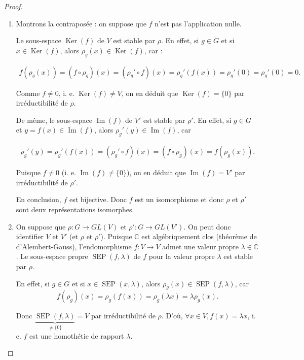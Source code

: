 \documentclass[french]{book}
\theoremstyle{definition}
\theoremstyle{remark}
\begin{document}
\begin{proof}

  \

  \begin{enumerate}
    \item Montrons la contraposée : on suppose que \(f\) n'est pas l'application nulle.

    Le sous-espace \(\operatorname{Ker}(f)\) de \(V\) est stable par \(\rho\). En effet, si \(g \in G\) et si \(x \in \operatorname{Ker}(f)\), alors \(\rho_g(x) \in \operatorname{Ker}(f)\), car :

    \begin{gather*}
      f(\rho_g(x)) = (f \circ \rho_g)(x) = (\rho_g' \circ f)(x) = \rho_g'(f(x)) = \rho_g'(0) = \rho_g'(0)=0.
    \end{gather*}

    Comme \(f \neq 0\), i. e. \(\operatorname{Ker}(f) \neq V\), on en déduit que \(\operatorname{Ker}(f) = \{ 0 \}\) par irréductibilité de \(\rho\).

    De même, le sous-espace \(\operatorname{Im}(f)\) de \(V'\) est stable par \(\rho'\). En effet, si \(g \in G\) et \(y=f(x) \in \operatorname{Im}(f)\), alors \(\rho_g'(y) \in \operatorname{Im}(f)\), car

    \begin{gather*}
      \rho_g'(y) = \rho_g'(f(x)) = (\rho_g' \circ f)(x) = (f \circ \rho_g)(x) = f(\rho_g(x)).
    \end{gather*}

    Puisque \(f \neq 0\) (i. e. \(\operatorname{Im}(f) \neq \{ 0 \} \)), on en déduit que \(\operatorname{Im}(f) = V'\) par irréductibilité de \(\rho'\).

    En conclusion, \(f\) est bijective. Donc \(f\) est un isomorphisme et donc \(\rho\) et \(\rho'\) sont deux représentations isomorphes.

    \item On suppose que \(\rho : G \longrightarrow GL(V)\) et \(\rho' : G \longrightarrow GL(V')\). On peut donc identifier \(V\) et \(V'\) (et \(\rho \text{ et } \rho'\)). Puisque \(\mathbb{C}\) est algébriquement clos (théorème de d'Alembert-Gauss), l'endomorphisme \(f : V \longrightarrow V \) admet une valeur propre \(\lambda \in \mathbb{C}\). Le sous-espace propre \(\operatorname{SEP}(f, \lambda)\) de \(f\) pour la valeur propre \(\lambda\) est stable par \(\rho\).

    En effet, si \(g \in G\) et si \(x \in \operatorname{SEP}(x, \lambda)\), alors \(\rho_g(x) \in \operatorname{SEP}(f, \lambda)\), car \[f(\rho_g)(x) = \rho_g(f(x)) = \rho_g(\lambda x) = \lambda \rho_g(x).\]

    Donc \( \underbrace{\operatorname{SEP}(f, \lambda)}_{\neq \{ 0 \}} = V\) par irréductibilité de \(\rho\). D'où, \( \forall x \in V, f(x) = \lambda x\), i. e. \(f\) est une homothétie de rapport \(\lambda\).
  \end{enumerate}
\end{proof}
\end{document}
